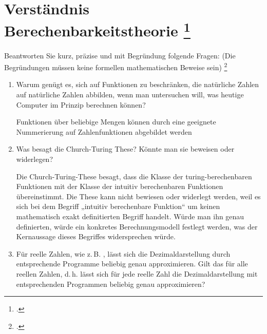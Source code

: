 \documentclass{lehramt-informatik-aufgabe}
\begin{document}
\section{Verständnis Berechenbarkeitstheorie
\footcite{66115:2016:03}}

Beantworten Sie kurz, präzise und mit Begründung folgende Fragen: (Die
Begründungen müssen keine formellen mathematischen Beweise sein)
\footcite[Aufgabe 9: F2016T2A2 (Check-Up)]{theo:ab:4}

\begin{enumerate}


\item Warum genügt es, sich auf Funktionen zu beschränken, die
natürliche Zahlen auf natürliche Zahlen abbilden, wenn man untersuchen
will, was heutige Computer im Prinzip berechnen können?

\begin{liAntwort}
Funktionen über beliebige Mengen können durch eine geeignete
Nummerierung auf Zahlenfunktionen abgebildet werden
\end{liAntwort}


\item Was besagt die Church-Turing These? Könnte man sie beweisen oder
widerlegen?

\begin{liAntwort}
Die Church-Turing-These besagt, dass die Klasse der turing-berechenbaren
Funktionen mit der Klasse der intuitiv berechenbaren Funktionen
übereinstimmt. Die These kann nicht bewiesen oder widerlegt werden, weil
es sich bei dem Begriff „intuitiv berechenbare Funktion“ um keinen
mathematisch exakt definitierten Begriff handelt. Würde man ihn genau
definierten, würde ein konkretes Berechnungsmodell festlegt werden, was
der Kernaussage dieses Begriffes widersprechen würde.
\end{liAntwort}


\item Für reelle Zahlen, wie z.\,B. , lässt sich die Dezimaldarstellung
durch entsprechende Programme beliebig genau approximieren. Gilt das für
alle reellen Zahlen, d.\,h. lässt sich für jede reelle Zahl die
Dezimaldarstellung mit entsprechenden Programmen beliebig genau
approximieren?



\end{enumerate}
\end{document}
